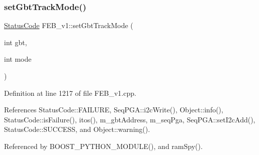 \subsubsection{\texorpdfstring{set\+Gbt\+Track\+Mode()}{setGbtTrackMode()}}
{\footnotesize\ttfamily \hyperlink{classStatusCode}{Status\+Code} F\+E\+B\+\_\+v1\+::set\+Gbt\+Track\+Mode (\begin{DoxyParamCaption}\item[{int}]{gbt,  }\item[{int}]{mode }\end{DoxyParamCaption})}



Definition at line 1217 of file F\+E\+B\+\_\+v1.\+cpp.



References Status\+Code\+::\+F\+A\+I\+L\+U\+RE, Seq\+P\+G\+A\+::i2c\+Write(), Object\+::info(), Status\+Code\+::is\+Failure(), itos(), m\+\_\+gbt\+Address, m\+\_\+seq\+Pga, Seq\+P\+G\+A\+::set\+I2c\+Add(), Status\+Code\+::\+S\+U\+C\+C\+E\+SS, and Object\+::warning().



Referenced by B\+O\+O\+S\+T\+\_\+\+P\+Y\+T\+H\+O\+N\+\_\+\+M\+O\+D\+U\+L\+E(), and ram\+Spy().


